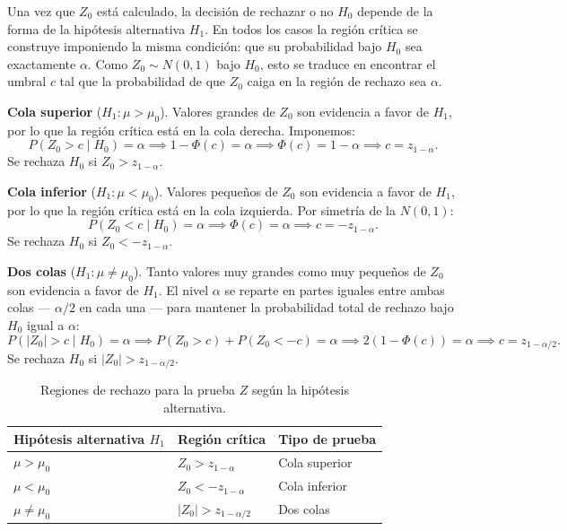 \documentclass[12pt, a4paper]{book}
\numberwithin{equation}{chapter}
\begin{document}
Una vez que $Z_0$ est\'{a} calculado, la decisi\'{o}n
de rechazar o no $H_0$ depende de la forma de la
hip\'{o}tesis alternativa $H_1$. En todos los casos
la regi\'{o}n cr\'{i}tica se construye imponiendo
la misma condici\'{o}n: que su probabilidad bajo
$H_0$ sea exactamente $\alpha$. Como $Z_0 \sim
N(0,1)$ bajo $H_0$, esto se traduce en encontrar
el umbral $c$ tal que la probabilidad de que $Z_0$
caiga en la regi\'{o}n de rechazo sea $\alpha$.

\medskip
\textbf{Cola superior} ($H_1: \mu > \mu_0$).
Valores grandes de $Z_0$ son evidencia a favor
de $H_1$, por lo que la regi\'{o}n cr\'{i}tica
est\'{a} en la cola derecha. Imponemos:
\[
P(Z_0 > c \mid H_0) = \alpha
\implies 1 - \Phi(c) = \alpha
\implies \Phi(c) = 1 - \alpha
\implies c = z_{1-\alpha}.
\]
Se rechaza $H_0$ si $Z_0 > z_{1-\alpha}$.

\medskip
\textbf{Cola inferior} ($H_1: \mu < \mu_0$).
Valores peque\~{n}os de $Z_0$ son evidencia a
favor de $H_1$, por lo que la regi\'{o}n
cr\'{i}tica est\'{a} en la cola izquierda.
Por simetr\'{i}a de la $N(0,1)$:
\[
P(Z_0 < c \mid H_0) = \alpha
\implies \Phi(c) = \alpha
\implies c = -z_{1-\alpha}.
\]
Se rechaza $H_0$ si $Z_0 < -z_{1-\alpha}$.

\medskip
\textbf{Dos colas} ($H_1: \mu \neq \mu_0$).
Tanto valores muy grandes como muy peque\~{n}os
de $Z_0$ son evidencia a favor de $H_1$. El nivel
$\alpha$ se reparte en partes iguales entre ambas
colas --- $\alpha/2$ en cada una --- para mantener
la probabilidad total de rechazo bajo $H_0$
igual a $\alpha$:
\[
P(|Z_0| > c \mid H_0) = \alpha
\implies P(Z_0 > c) + P(Z_0 < -c) = \alpha
\implies 2(1 - \Phi(c)) = \alpha
\implies c = z_{1-\alpha/2}.
\]
Se rechaza $H_0$ si $|Z_0| > z_{1-\alpha/2}$.

\begin{table}[H]
	\centering
	\begin{tabular}{lll}
		\toprule
		\textbf{Hip\'{o}tesis alternativa $H_1$} &
		\textbf{Regi\'{o}n cr\'{i}tica} &
		\textbf{Tipo de prueba} \\
		\midrule
		$\mu > \mu_0$ &
		$Z_0 > z_{1-\alpha}$ &
		Cola superior \\[4pt]
		$\mu < \mu_0$ &
		$Z_0 < -z_{1-\alpha}$ &
		Cola inferior \\[4pt]
		$\mu \neq \mu_0$ &
		$|Z_0| > z_{1-\alpha/2}$ &
		Dos colas \\
		\bottomrule
	\end{tabular}
	\caption{Regiones de rechazo para la prueba $Z$
		seg\'{u}n la hip\'{o}tesis alternativa.}
	\label{tab:regiones-z}
\end{table}
\end{document}
